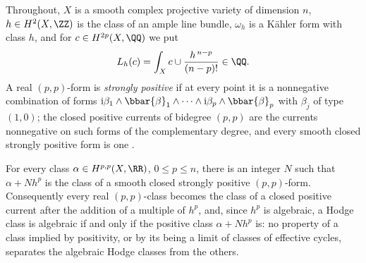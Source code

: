 Throughout, $X$ is a smooth complex projective variety of dimension $n$, $h\in
H^{2}(X,\ZZ)$ is the class of an ample line bundle, $\omega_{h}$ is a K\"ahler
form with class $h$, and for $c\in H^{2p}(X,\QQ)$ we put
\[
  L_{h}(c)=\int_{X}c\cup\frac{h^{\,n-p}}{(n-p)!}\in\QQ .
\]
A real $(p,p)$-form is \emph{strongly positive} if at every point it is a
nonnegative combination of forms $\mathrm{i}\beta_{1}\wedge\bbar{\beta}_{1}
\wedge\cdots\wedge\mathrm{i}\beta_{p}\wedge\bbar{\beta}_{p}$ with $\beta_{j}$
of type $(1,0)$; the closed positive currents of bidegree $(p,p)$ are the
currents nonnegative on such forms of the complementary degree, and every
smooth closed strongly positive form is one \cite[Chapter~III]{Dem12}.

\begin{proposition}\label{prop:positivitynotest}
For every class $\alpha\in H^{p,p}(X,\RR)$, $0\le p\le n$, there is an integer
$N$ such that $\alpha+Nh^{p}$ is the class of a smooth closed strongly positive
$(p,p)$-form. Consequently every real $(p,p)$-class becomes the class of a
closed positive current after the addition of a multiple of $h^{p}$, and, since
$h^{p}$ is algebraic, a Hodge class is algebraic if and only if the positive
class $\alpha+Nh^{p}$ is: no property of a class implied by positivity, or by
its being a limit of classes of effective cycles, separates the algebraic Hodge
classes from the others.
\end{proposition}


